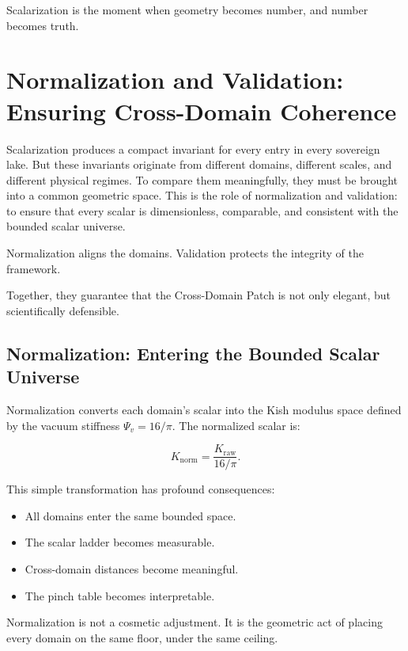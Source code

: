 \documentclass[11pt, letterpaper, openany]{book}
\begin{document}
Scalarization is the moment when geometry becomes number, and number becomes truth.

\chapter{Normalization and Validation: Ensuring Cross-Domain Coherence}

Scalarization produces a compact invariant for every entry in every sovereign lake. But these
invariants originate from different domains, different scales, and different physical regimes. To
compare them meaningfully, they must be brought into a common geometric space. This is the role
of normalization and validation: to ensure that every scalar is dimensionless, comparable, and
consistent with the bounded scalar universe.

Normalization aligns the domains.  
Validation protects the integrity of the framework.

Together, they guarantee that the Cross-Domain Patch is not only elegant, but scientifically
defensible.

\section*{Normalization: Entering the Bounded Scalar Universe}
Normalization converts each domain’s scalar into the Kish modulus space defined by the vacuum
stiffness $\Psi_v = 16/\pi$. The normalized scalar is:



\[
K_{\mathrm{norm}} = \frac{K_{\mathrm{raw}}}{16/\pi}.
\]



This simple transformation has profound consequences:

\begin{itemize}
    \item All domains enter the same bounded space.
    \item The scalar ladder becomes measurable.
    \item Cross-domain distances become meaningful.
    \item The pinch table becomes interpretable.
\end{itemize}

Normalization is not a cosmetic adjustment.  
It is the geometric act of placing every domain on the same floor, under the same ceiling.
\end{document}
